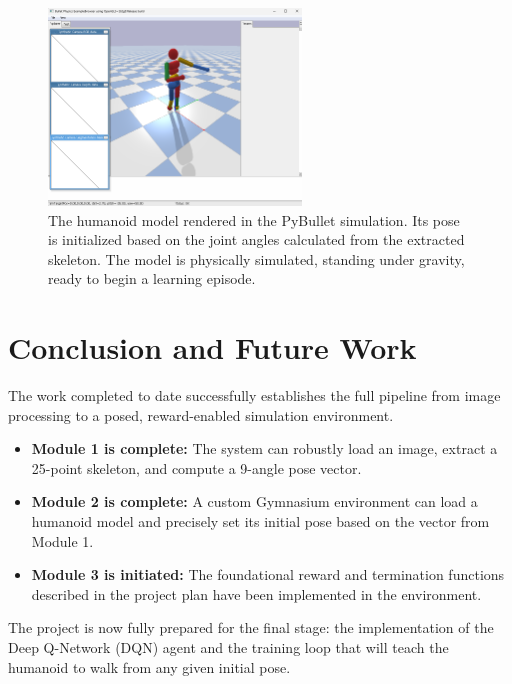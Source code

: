 \documentclass{article}
\begin{document}
\begin{figure}[h!]
    \centering
    \includegraphics[width=0.6\textwidth]{Testing/humanoid_screenshot.png}
    \caption{The humanoid model rendered in the PyBullet simulation. Its pose is initialized based on the joint angles calculated from the extracted skeleton. The model is physically simulated, standing under gravity, ready to begin a learning episode.}
    \label{fig:humanoid_screenshot}
\end{figure}

\section{Conclusion and Future Work}
The work completed to date successfully establishes the full pipeline from image processing to a posed, reward-enabled simulation environment.
\begin{itemize}
    \item \textbf{Module 1 is complete:} The system can robustly load an image, extract a 25-point skeleton, and compute a 9-angle pose vector.
    \item \textbf{Module 2 is complete:} A custom Gymnasium environment can load a humanoid model and precisely set its initial pose based on the vector from Module 1.
    \item \textbf{Module 3 is initiated:} The foundational reward and termination functions described in the project plan have been implemented in the environment.
\end{itemize}
The project is now fully prepared for the final stage: the implementation of the Deep Q-Network (DQN) agent and the training loop that will teach the humanoid to walk from any given initial pose.
\end{document}
